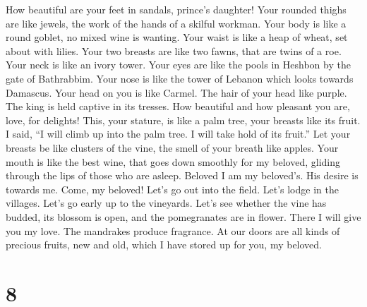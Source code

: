  How beautiful are your feet in sandals, prince's daughter!
Your rounded thighs are like jewels, the work of the hands of a skilful
workman.  Your body is like a round goblet, no mixed wine is
wanting. Your waist is like a heap of wheat, set about with lilies.
 Your two breasts are like two fawns, that are twins of a
roe.  Your neck is like an ivory tower. Your eyes are like
the pools in Heshbon by the gate of Bathrabbim. Your nose is like the
tower of Lebanon which looks towards Damascus.  Your head on
you is like Carmel. The hair of your head like purple. The king is held
captive in its tresses.  How beautiful and how pleasant you
are, love, for delights!  This, your stature, is like a palm
tree, your breasts like its fruit.  I said, ``I will climb
up into the palm tree. I will take hold of its fruit.'' Let your breasts
be like clusters of the vine, the smell of your breath like apples.
 Your mouth is like the best wine, that goes down smoothly
for my beloved, gliding through the lips of those who are asleep.
Beloved  I am my beloved's. His desire is towards me.
 Come, my beloved! Let's go out into the field. Let's lodge
in the villages.  Let's go early up to the vineyards. Let's
see whether the vine has budded, its blossom is open, and the
pomegranates are in flower. There I will give you my love. 
The mandrakes produce fragrance. At our doors are all kinds of precious
fruits, new and old, which I have stored up for you, my beloved.

\hypertarget{section-7}{%
\section{8}\label{section-7}}

